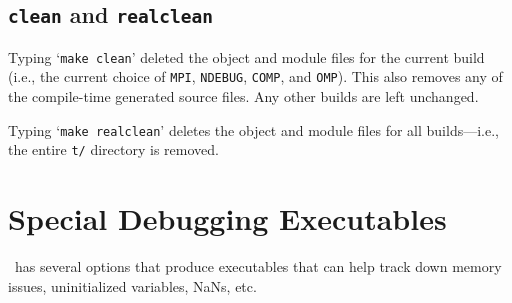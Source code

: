 \subsection{{\tt clean} and {\tt realclean}}

Typing `{\tt make clean}' deleted the object and module files for the
current build (i.e., the current choice of {\tt MPI}, {\tt NDEBUG},
{\tt COMP}, and {\tt OMP}).  This also removes any of the compile-time
generated source files.  Any other builds are left unchanged.

Typing `{\tt make realclean}' deletes the object and module files for
all builds---i.e., the entire {\tt t/} directory is removed.


\section{Special Debugging Executables}

\boxlib\ has several options that produce executables that can help
track down memory issues, uninitialized variables, NaNs, etc.

